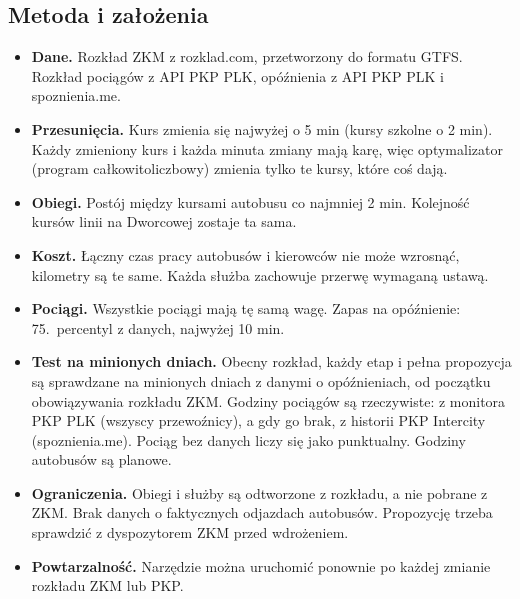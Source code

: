\documentclass[10pt,a4paper]{article}
\begin{document}
\subsection*{Metoda i założenia}
\begin{itemize}
\item \textbf{Dane.} Rozkład ZKM z rozklad.com, przetworzony do formatu GTFS. Rozkład pociągów z API PKP PLK, opóźnienia z API PKP PLK i spoznienia.me.
\item \textbf{Przesunięcia.} Kurs zmienia się najwyżej o 5 min (kursy szkolne o 2 min). Każdy zmieniony kurs i każda minuta zmiany mają karę, więc optymalizator (program całkowitoliczbowy) zmienia tylko te kursy, które coś dają.
\item \textbf{Obiegi.} Postój między kursami autobusu co najmniej 2 min. Kolejność kursów linii na Dworcowej zostaje ta sama.
\item \textbf{Koszt.} Łączny czas pracy autobusów i kierowców nie może wzrosnąć, kilometry są te same. Każda służba zachowuje przerwę wymaganą ustawą.
\item \textbf{Pociągi.} Wszystkie pociągi mają tę samą wagę. Zapas na opóźnienie: 75.\ percentyl z danych, najwyżej 10 min.
\item \textbf{Test na minionych dniach.} Obecny rozkład, każdy etap i pełna propozycja są sprawdzane na minionych dniach z danymi o opóźnieniach, od początku obowiązywania rozkładu ZKM. Godziny pociągów są rzeczywiste: z monitora PKP PLK (wszyscy przewoźnicy), a gdy go brak, z historii PKP Intercity (spoznienia.me). Pociąg bez danych liczy się jako punktualny. Godziny autobusów są planowe.
\item \textbf{Ograniczenia.} Obiegi i służby są odtworzone z rozkładu, a nie pobrane z ZKM. Brak danych o faktycznych odjazdach autobusów. Propozycję trzeba sprawdzić z dyspozytorem ZKM przed wdrożeniem.
\item \textbf{Powtarzalność.} Narzędzie można uruchomić ponownie po każdej zmianie rozkładu ZKM lub PKP.
\end{itemize}
\end{document}
